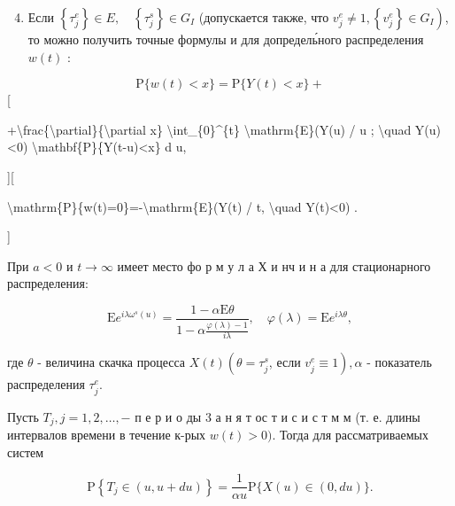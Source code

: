 \documentclass[10pt]{article}
\begin{document}
\begin{enumerate}

  \setcounter{enumi}{3}

  \item Если $\left\{\tau_{j}^{e}\right\} \in E, \quad\left\{\tau_{j}^{s}\right\} \in G_{I}$ (допускается также, что $\left.v_{j}^{e} \neq 1,\left\{v_{j}^{e}\right\} \in G_{I}\right)$, то можно получить точные формулы и для допредель́ного распределения $w(t)$ :

\end{enumerate}



\[

\mathrm{P}\{w(t)<x\}=\mathrm{P}\{Y(t)<x\}+

\][



+\textbackslash frac\{\textbackslash partial\}\{\textbackslash partial x\} \textbackslash int\_\{0\}\^{}\{t\} \textbackslash mathrm\{E\}(Y(u) / u ; \textbackslash quad Y(u)<0) \textbackslash mathbf\{P\}\{Y(t-u)<x\} d u,



][



\textbackslash mathrm\{P\}\{w(t)=0\}=-\textbackslash mathrm\{E\}(Y(t) / t, \textbackslash quad Y(t)<0) .

]



При $a<0$ и $t \rightarrow \infty$ имеет место фо р м у л а Х и нч и н а для стационарного распределения:



\[

\mathrm{E} e^{i \lambda \omega^{s}(u)}=\frac{1-\alpha \mathrm{E} \theta}{1-\alpha \frac{\varphi(\lambda)-1}{i \lambda}}, \quad \varphi(\lambda)=\mathrm{E} e^{i \lambda \theta},

\]



где $\theta$ - величина скачка процесса $X(t)\left(\theta=\tau_{j}^{s}\right.$, если $\left.v_{j}^{e} \equiv 1\right), \alpha$ - показатель распределения $\tau_{j}^{e}$.



Пусть $T_{j}, j=1,2, \ldots,-$ п е р и о ды 3 а н я т ос т и с и с т м м (т. е. длины интервалов времени в течение к-рых $w(t)>0)$. Тогда для рассматриваемых систем



\[

\mathrm{P}\left\{T_{j} \in(u, u+d u)\right\}=\frac{1}{\alpha u} \mathrm{P}\{X(u) \in(0, d u)\} .

\]
\end{document}
